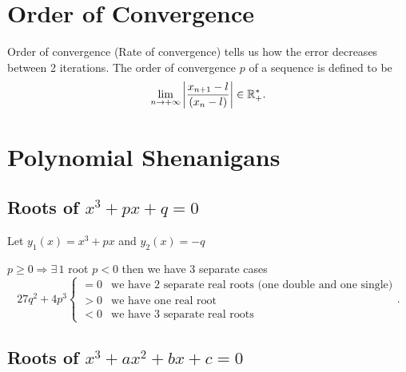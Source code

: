 \documentclass{report}
\begin{document}
\section{Order of Convergence}
Order of convergence (Rate of convergence) tells us how the error decreases between 2 iterations. The order of convergence $p$ of a sequence is defined to be
\[
	\lim_{n\to+\infty}\lt|\frac{x_{n+1}-l}{(x_n-l)}\rt|\in \RR^*_+
	.\]



\section{Polynomial Shenanigans}
\subsection{Roots of $x^3 + px + q = 0$}

Let $y_1(x) = x^3 + px$ and $y_2(x)=-q$

\begin{itemize}
	\ii $p\geq 0\Rightarrow \exists\,1$ root
	\ii $p<0$ then we have 3 separate cases
	\[
		27q^2 + 4p^3 \begin{cases}
			=0 & \text{we have 2 separate real roots (one double and one single)} \\
			>0 & \text{we have one real root}                                     \\
			<0 & \text{we have 3 separate real roots}
		\end{cases}
		.\]
\end{itemize}

\subsection{Roots of $x^3+ax^2 + bx +c = 0$}
\end{document}
